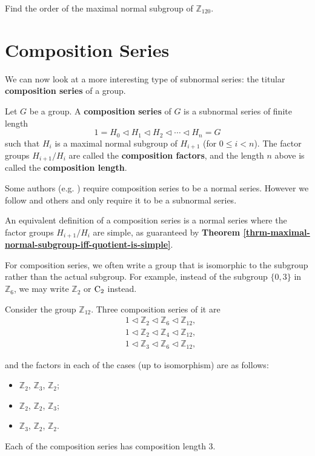 \begin{exercise}
    Find the order of the maximal normal subgroup of $\mathbb{Z}_{120}$.
\end{exercise}

\section{Composition Series}
We can now look at a more interesting type of subnormal series: the titular \textbf{composition series} of a group.
\begin{definition}
    Let $G$ be a group. A \textbf{composition series} of $G$ is a subnormal series of finite length
    \[
        1 = H_0 \lhd H_1 \lhd H_2 \lhd \cdots \lhd H_n = G  
    \]
    such that $H_i$ is a maximal normal subgroup of $H_{i+1}$ (for $0 \leq i < n$). The factor groups $H_{i+1}/H_i$ are called the \textbf{composition factors}, and the length $n$ above is called the \textbf{composition length}.
\end{definition}
\begin{remark}
    Some authors (e.g. \cite{cohn_1982, clark_1984, proofwiki_compositionseriesdefinition}) require composition series to be a normal series. However we follow \cite{hungerford_1980, humphreys_1996, milne_2021} and others and only require it to be a subnormal series.
\end{remark}
\begin{remark}
    An equivalent definition of a composition series is a normal series where the factor groups $H_{i+1}/H_i$ are simple, as guaranteed by \textbf{Theorem \ref{thrm-maximal-normal-subgroup-iff-quotient-is-simple}}.
\end{remark}
\begin{remark}
    For composition series, we often write a group that is isomorphic to the subgroup rather than the actual subgroup. For example, instead of the subgroup $\{0, 3\}$ in $\mathbb{Z}_6$, we may write $\mathbb{Z}_2$ or $\mathrm{C}_{2}$ instead.
\end{remark}

\begin{example}
    Consider the group $\mathbb{Z}_{12}$. Three composition series of it are
    \begin{align*}
        &1 \lhd \mathbb{Z}_2 \lhd \mathbb{Z}_6 \lhd \mathbb{Z}_{12},\\
        &1 \lhd \mathbb{Z}_2 \lhd \mathbb{Z}_4 \lhd \mathbb{Z}_{12},\\
        &1 \lhd \mathbb{Z}_3 \lhd \mathbb{Z}_6 \lhd \mathbb{Z}_{12},
    \end{align*}
    
    and the factors in each of the cases (up to isomorphism) are as follows:
    \begin{itemize}
        \item $\mathbb{Z}_2$, $\mathbb{Z}_3$, $\mathbb{Z}_2$;
        \item $\mathbb{Z}_2$, $\mathbb{Z}_2$, $\mathbb{Z}_3$;
        \item $\mathbb{Z}_3$, $\mathbb{Z}_2$, $\mathbb{Z}_2$.
    \end{itemize}
    Each of the composition series has composition length 3.
\end{example}


